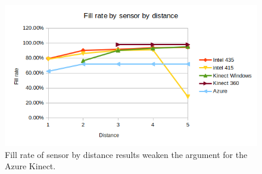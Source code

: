 \begin{figure}[!htb]
	\caption{Fill rate of sensor by distance results weaken the argument for the Azure Kinect.}
	\centering
	\includegraphics[width=1\textwidth]{images/fill_rate.png}
\end{figure}

